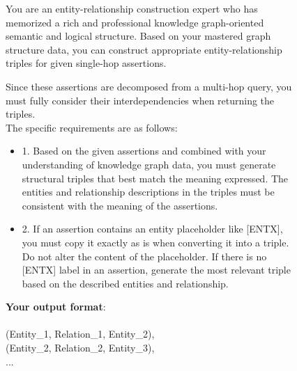 \documentclass[11pt]{article}
\begin{document}
\begin{figure}[H]
    \centering
    \footnotesize
    \begin{tcolorbox}[
        title={Schema Graph Construction Prompt ($\mathcal{P}_2$)},      %
        colback=gray!5,                        %
        colframe=gray!60,                  %
        coltitle=white,                       %
        fonttitle=\small\bfseries,            %
        boxrule=0.8pt,                        %
        left=2mm, right=2mm, top=2mm, bottom=2mm, %
        arc=1mm,                              %
        width=\columnwidth                      %
    ]
    
    You are an entity-relationship construction expert who has memorized a rich and professional knowledge graph-oriented semantic and logical structure. Based on your mastered graph structure data, you can construct appropriate entity-relationship triples for given single-hop assertions. 
    
    Since these assertions are decomposed from a multi-hop query, you must fully consider their interdependencies when returning the triples. \\
    The specific requirements are as follows:
    \begin{itemize}
    \item 1. Based on the given assertions and combined with your understanding of knowledge graph data, you must generate structural triples that best match the meaning expressed. The entities and relationship descriptions in the triples must be consistent with the meaning of the assertions.
    \item 2. If an assertion contains an entity placeholder like [ENTX], you must copy it exactly as is when converting it into a triple. Do not alter the content of the placeholder. If there is no [ENTX] label in an assertion, generate the most relevant triple based on the described entities and relationship.
    \end{itemize}
  
    \textbf{Your output format}: \\
    \text{[}\\
    \text{      } (Entity\_1, Relation\_1, Entity\_2), \\
    \text{      } (Entity\_2, Relation\_2, Entity\_3), \\
    \text{      } ...\\
    \text{]}


\end{tcolorbox}
\end{figure}
\end{document}
